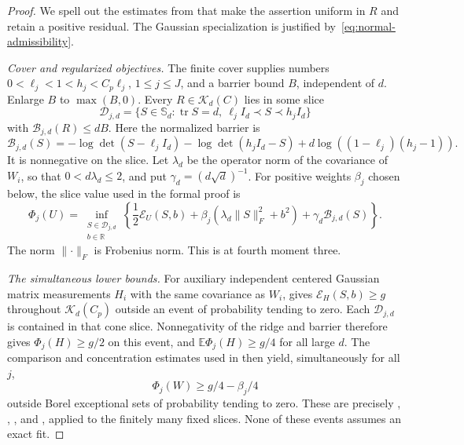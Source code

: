 \documentclass[11pt]{article}
\newcommand{\R}{\mathbb R}
\newcommand{\E}{\mathbb E}
\newcommand{\Sym}{\mathbb S}
\DeclareMathOperator{\tr}{tr}
\newcommand{\norm}[1]{\lVert#1\rVert}
\theoremstyle{remark}
\begin{document}
\begin{proof}
We spell out the estimates from
 that make the assertion uniform in
$R$ and retain a positive residual. The Gaussian specialization is
justified by~\eqref{eq:normal-admissibility}.

\emph{Cover and regularized objectives.}
The finite cover  supplies numbers
$0<\ell_j<1<h_j<C_p\ell_j$, $1\le j\le J$, and a barrier bound $B$,
independent of $d$. Enlarge $B$ to $\max(B,0)$. Every
$R\in\mathcal K_d(C)$ lies in some slice
\[
 \mathcal D_{j,d}=\{S\in\Sym_d:\tr S=d,\ \ell_j I_d\prec S\prec h_jI_d\}
\]
with $\mathcal B_{j,d}(R)\le dB$. Here the normalized barrier is
\[
 \mathcal B_{j,d}(S)=-\log\det(S-\ell_jI_d)
    -\log\det(h_jI_d-S)+d\log((1-\ell_j)(h_j-1)).
\]
It is nonnegative on the slice. Let $\lambda_d$ be the operator norm
of the covariance of $W_i$, so that $0<d\lambda_d\le2$, and put
$\gamma_d=(d\sqrt d)^{-1}$. For positive weights $\beta_j$ chosen below,
the slice value used in the formal proof is
\begin{equation}\label{eq:slice-value}
 \Phi_j(U)=\inf_{\substack{S\in\mathcal D_{j,d}\\b\in\R}}
 \left\{\frac12\mathcal E_U(S,b)
   +\beta_j(\lambda_d\norm S_F^2+b^2)
   +\gamma_d\mathcal B_{j,d}(S)\right\}.
\end{equation}
The norm $\norm\cdot_F$ is Frobenius norm. This is  at
fourth moment three.

\emph{The simultaneous lower bounds.}
For auxiliary independent centered Gaussian matrix measurements $H_i$ with the
same covariance as $W_i$,  gives
$\mathcal E_H(S,b)\ge g$ throughout $\mathcal K_d(C_p)$ outside
an event of probability tending to zero. Each $\mathcal D_{j,d}$ is
contained in that cone slice. Nonnegativity of the ridge and barrier
therefore gives $\Phi_j(H)\ge g/2$ on this event, and
$\E\Phi_j(H)\ge g/4$ for all large $d$.
The comparison and concentration estimates used in
 then yield, simultaneously for all $j$,
\begin{equation}\label{eq:slice-lower}
 \Phi_j(W)\ge g/4-\beta_j/4
\end{equation}
outside Borel exceptional sets of probability tending to zero.
These are precisely , ,
, and , applied to the finitely
many fixed slices. None of these events assumes an exact fit.


\end{proof}
\end{document}
